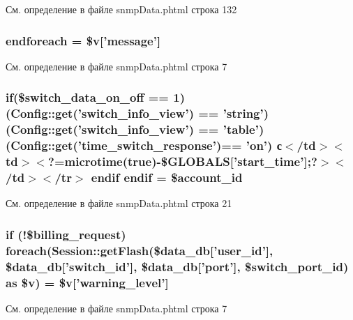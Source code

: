 См. определение в файле snmp\-Data.\-phtml строка 132

\hypertarget{snmp_data_8phtml_a672d9707ef91db026c210f98cc601123}{
\subsubsection[{endforeach}]{\setlength{\rightskip}{0pt plus 5cm}endforeach = \$v\mbox{[}'message'\mbox{]}}}\label{snmp_data_8phtml_a672d9707ef91db026c210f98cc601123}


См. определение в файле snmp\-Data.\-phtml строка 7

\hypertarget{snmp_data_8phtml_ad46029792e22c84c23775487f5df39df}{
\subsubsection[{endif}]{\setlength{\rightskip}{0pt plus 5cm}if(\$switch\-\_\-data\-\_\-on\-\_\-off == 1)({\bf Config\-::get}('switch\-\_\-info\-\_\-view') == 'string') ({\bf Config\-::get}('switch\-\_\-info\-\_\-view') == 'table') ({\bf Config\-::get}('time\-\_\-switch\-\_\-response')== 'on') с$<$/td$>$$<$td$>$$<$?=microtime(true)-\/\$G\-L\-O\-B\-A\-L\-S\mbox{[}'start\-\_\-time'\mbox{]};?$>$$<$/td$>$$<$/tr$>$ endif endif = \$account\-\_\-id}}\label{snmp_data_8phtml_ad46029792e22c84c23775487f5df39df}


См. определение в файле snmp\-Data.\-phtml строка 21

\hypertarget{snmp_data_8phtml_ad4128fad7b5af6f950a9b08c7a326c07}{
\subsubsection[{foreach}]{\setlength{\rightskip}{0pt plus 5cm}if (!\$billing\-\_\-request) foreach({\bf Session\-::get\-Flash}(\$data\-\_\-db\mbox{[}'user\-\_\-id'\mbox{]}, \$data\-\_\-db\mbox{[}'switch\-\_\-id'\mbox{]}, \$data\-\_\-db\mbox{[}'port'\mbox{]}, \$switch\-\_\-port\-\_\-id) as \$v) = \$v\mbox{[}'warning\-\_\-level'\mbox{]}}}\label{snmp_data_8phtml_ad4128fad7b5af6f950a9b08c7a326c07}


См. определение в файле snmp\-Data.\-phtml строка 7

